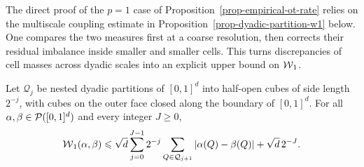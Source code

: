 The direct proof of the \(p=1\) case of Proposition~\ref{prop-empirical-ot-rate} relies on the multiscale coupling estimate in Proposition~\ref{prop-dyadic-partition-w1} below. One compares the two measures first at a coarse resolution, then corrects their residual imbalance inside smaller and smaller cells. This turns discrepancies of cell masses across dyadic scales into an explicit upper bound on \(\operatorname{\mathcal{W}}_1\).

\begin{prop}\label{prop-dyadic-partition-w1}
	Let \(\mathcal Q_j\) be nested dyadic partitions of \([0,1]^d\) into half-open cubes of side length \(2^{-j}\), with cubes on the outer face closed along the boundary of \([0,1]^d\). For all \(\alpha,\beta\in\mathcal{P}([0,1]^d)\) and every integer \(J\geq0\),
	\[
		\operatorname{\mathcal{W}}_1(\alpha,\beta)
		\leqslant
		\sqrt d
		\sum_{j=0}^{J-1}2^{-j}
		\sum_{Q\in\mathcal Q_{j+1}}\left\lvert\alpha(Q)-\beta(Q)\right\rvert
		+
		\sqrt d\,2^{-J}.
	\]
\end{prop}

